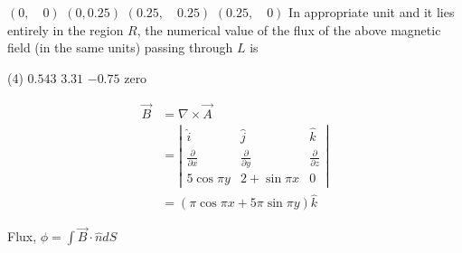 \begin{questions}
\begin{minipage}{\textwidth}
	$(0, \quad 0)$
	$(0,0.25)$
	$(0.25, \quad 0.25)$
	$(0.25, \quad 0)$
	In appropriate unit and it lies entirely in the region $R$, the numerical value of the flux of the above magnetic field (in the same units) passing through $L$ is
\end{minipage}
\begin{tasks}(4)
	\task[\textbf{A.}] $0.543$
	\task[\textbf{B.}] $3.31$
	\task[\textbf{C.}] $-0.75$
	\task[\textbf{D.}] zero
\end{tasks}
\begin{answer}
	$$
	\begin{aligned}
	\vec{B} &=\nabla \times \vec{A} \\
	&=\left|\begin{array}{ccc}
	\hat{i} & \hat{j} & \hat{k} \\
	\frac{\partial}{\partial x} & \frac{\partial}{\partial y} & \frac{\partial}{\partial z} \\
	5 \cos \pi y & 2+\sin \pi x & 0
	\end{array}\right| \\
	&=(\pi \cos \pi x+5 \pi \sin \pi y) \hat{k}
	\end{aligned}
	$$
	
	Flux, $\phi=\int \vec{B} \cdot \hat{n} d S$
	

\end{answer}
\end{questions}
